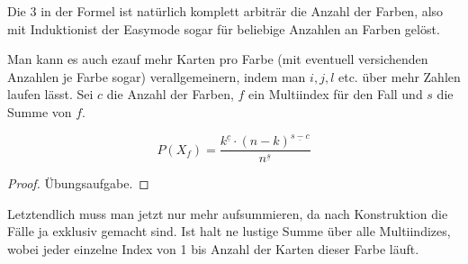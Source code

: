 \documentclass[../main.tex]{subfiles}
\begin{document}
Die $3$ in der Formel ist natürlich komplett arbiträr die Anzahl der Farben, also mit Induktion\texttrademark ist der Easymode sogar für beliebige Anzahlen an Farben gelöst.

Man kann es auch ez\texttrademark auf mehr Karten pro Farbe (mit eventuell versichenden Anzahlen je Farbe sogar) verallgemeinern, indem man $i, j, l$ etc. über mehr Zahlen laufen lässt. Sei $c$ die Anzahl der Farben, $f$ ein Multiindex für den Fall und $s$ die Summe von $f$.

\begin{equation*}
    P(X_f) = \frac{k^{\underline{c}} \cdot (n-k)^{\underline{s-c}}}{n^{\underline{s}}}
\end{equation*}

\begin{proof}
    Übungsaufgabe.
\end{proof}

Letztendlich muss man jetzt nur mehr aufsummieren, da nach Konstruktion die Fälle ja exklusiv gemacht sind. Ist halt ne lustige Summe über alle Multiindizes, wobei jeder einzelne Index von 1 bis Anzahl der Karten dieser Farbe läuft.

\fi
\end{document}
